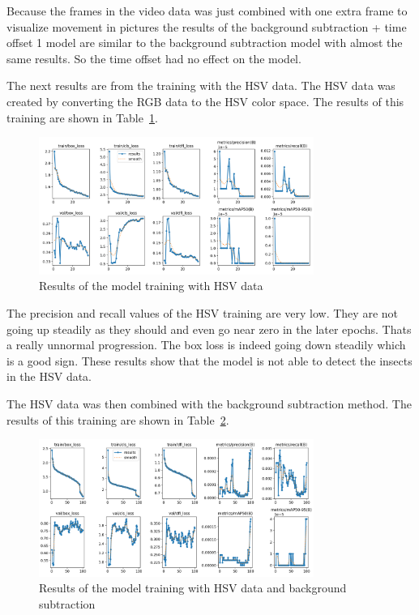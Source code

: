 Because the frames in the video data was just combined with one extra frame to visualize movement in pictures the results of the background subtraction + time offset 1 model are similar to the background subtraction model with almost the same results. So the time offset had no effect on the model.

The next results are from the training with the HSV data. The HSV data was created by converting the RGB data to the HSV color space. The results of this training are shown in Table~\ref{fig:results_hsv}.

\begin{figure}[htbp] 
    \centering
    \includegraphics[width=0.8\textwidth]{images/results/hsv_results.png}
    \caption{Results of the model training with HSV data}
    \label{fig:results_hsv}
\end{figure}

The precision and recall values of the HSV training are very low. They are not going up steadily as they should and even go near zero in the later epochs. Thats a really unnormal progression. The box loss is indeed going down steadily which is a good sign. These results show that the model is not able to detect the insects in the HSV data.

The HSV data was then combined with the background subtraction method. The results of this training are shown in Table~\ref{fig:results_hsv_bgsub}.

\begin{figure}[htbp] 
    \centering
    \includegraphics[width=0.8\textwidth]{images/results/hsv_bgsub_results.png}
    \caption{Results of the model training with HSV data and background subtraction}
    \label{fig:results_hsv_bgsub}
\end{figure}

